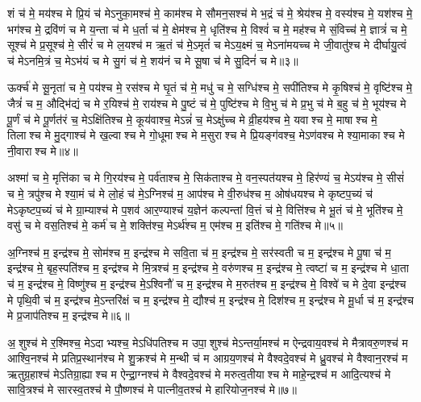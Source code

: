 शं च॑ मे॒ मय॑श्च मे प्रि॒यं च॑ मेऽनुका॒मश्च॑ मे॒ काम॑श्च मे सौमन॒सश्च॑ मे भ॒द्रं च॑ मे॒ श्रेय॑श्च मे॒ वस्य॑श्च मे॒ यश॑श्च मे॒ भग॑श्च मे॒ द्रवि॑णं च मे य॒न्ता च॑ मे ध॒र्ता च॑ मे॒ क्षेम॑श्च मे॒ धृति॑श्च मे॒ विश्वं॑ च मे॒ मह॑श्च मे सं॒विच्च॑ मे॒ ज्ञात्रं॑ च मे॒ सूश्च॑ मे प्र॒सूश्च॑ मे॒ सीरं॑ च मे ल॒यश्च॑ म ऋ॒तं च॑ मे॒ऽमृतं॑ च मेऽय॒क्ष्मं च॒ मेऽना॑मयच्च मे जी॒वातु॑श्च मे दीर्घायु॒त्वं च॑ मेऽनमि॒त्रं च॒ मेऽभ॑यं च मे सु॒गं च॑ मे॒ शय॑नं च मे सू॒षा च॑ मे सु॒दिनं॑ च मे॥३॥ 

ऊर्क्च॑ मे सू॒नृता॑ च मे॒ पय॑श्च मे॒ रस॑श्च मे घृ॒तं च॑ मे॒ मधु॑ च मे॒ सग्धि॑श्च मे॒ सपी॑तिश्च मे कृ॒षिश्च॑ मे॒ वृष्टि॑श्च मे॒ जैत्रं॑ च म॒ औद्भि॑द्यं च मे र॒यिश्च॑ मे॒ राय॑श्च मे पु॒ष्टं च॑ मे॒ पुष्टि॑श्च मे वि॒भु च॑ मे प्र॒भु च॑ मे ब॒हु च॑ मे॒ भूय॑श्च मे पू॒र्णं च॑ मे पू॒र्णत॑रं च॒ मेऽक्षि॑तिश्च मे॒ कूय॑वाश्च॒ मेऽन्नं॑ च॒ मेऽक्षु॑च्च मे व्री॒हय॑श्च मे॒ यवाश्च मे॒ माषाश्च मे॒ तिलाश्च मे मु॒द्गाश्च॑ मे ख॒ल्वाश्च मे गो॒धूमाश्च मे म॒सुराश्च मे प्रि॒यङ्ग॑वश्च॒ मेऽण॑वश्च मे श्या॒माकाश्च मे नी॒वाराश्च मे॥४॥ 

अश्मा॑ च मे॒ मृत्ति॑का च मे गि॒रय॑श्च मे॒ पर्व॑ताश्च मे॒ सिक॑ताश्च मे॒ वन॒स्पत॑यश्च मे॒ हिर॑ण्यं च॒ मेऽय॑श्च मे॒ सीसं॑ च मे॒ त्रपु॑श्च मे श्या॒मं च॑ मे लो॒हं च॑ मे॒ऽग्निश्च॑ म॒ आप॑श्च मे वी॒रुध॑श्च म॒ ओष॑धयश्च मे कृष्टप॒च्यं च॑ मेऽकृष्टप॒च्यं च॑ मे ग्रा॒म्याश्च॑ मे प॒शव॑ आर॒ण्याश्च॑ य॒ज्ञेन॑ कल्पन्तां वि॒त्तं च॑ मे॒ वित्ति॑श्च मे भू॒तं च॑ मे॒ भूति॑श्च मे॒ वसु॑ च मे वस॒तिश्च॑ मे॒ कर्म॑ च मे॒ शक्ति॑श्च॒ मेऽर्थ॑श्च म॒ एम॑श्च म॒ इति॑श्च मे॒ गति॑श्च मे॥५॥ 

अ॒ग्निश्च॑ म॒ इन्द्र॑श्च मे॒ सोम॑श्च म॒ इन्द्र॑श्च मे सवि॒ता च॑ म॒ इन्द्र॑श्च मे॒ सर॑स्वती च म॒ इन्द्र॑श्च मे पू॒षा च॑ म॒ इन्द्र॑श्च मे॒ बृह॒स्पति॑श्च म॒ इन्द्र॑श्च मे मि॒त्रश्च॑ म॒ इन्द्र॑श्च मे॒ वरु॑णश्च म॒ इन्द्र॑श्च मे॒ त्वष्टा॑ च म॒ इन्द्र॑श्च मे धा॒ता च॑ म॒ इन्द्र॑श्च मे॒ विष्णु॑श्च म॒ इन्द्र॑श्च मे॒ऽश्विनौ॑ च म॒ इन्द्र॑श्च मे म॒रुत॑श्च म॒ इन्द्र॑श्च मे॒ विश्वे॑ च मे दे॒वा इन्द्र॑श्च मे पृथि॒वी च॑ म॒ इन्द्र॑श्च मे॒ऽन्तरि॑क्षं च म॒ इन्द्र॑श्च मे॒ द्यौश्च॑ म॒ इन्द्र॑श्च मे॒ दिश॑श्च म॒ इन्द्र॑श्च मे मू॒र्धा च॑ म॒ इन्द्र॑श्च मे प्र॒जाप॑तिश्च म॒ इन्द्र॑श्च मे॥६॥ 

अ॒शुश्च॑ मे र॒श्मिश्च॒ मेऽदाभ्यश्च॒ मेऽधि॑पतिश्च म उपा॒शुश्च॑ मेऽन्तर्या॒मश्च॑ म ऐन्द्रवाय॒वश्च॑ मे मैत्रावरु॒णश्च॑ म आश्वि॒नश्च॑ मे प्रतिप्र॒स्थान॑श्च मे शु॒क्रश्च॑ मे म॒न्थी च॑ म आग्रय॒णश्च॑ मे वैश्वदे॒वश्च॑ मे ध्रु॒वश्च॑ मे वैश्वान॒रश्च॑ म ऋतुग्र॒हाश्च॑ मेऽतिग्रा॒ह्याश्च म ऐन्द्रा॒ग्नश्च॑ मे वैश्वदे॒वश्च॑ मे मरुत्व॒तीयाश्च मे माहे॒न्द्रश्च॑ म आदि॒त्यश्च॑ मे सावि॒त्रश्च॑ मे सारस्व॒तश्च॑ मे पौ॒ष्णश्च॑ मे पात्नीव॒तश्च॑ मे हारियोज॒नश्च॑ मे॥७॥ 

